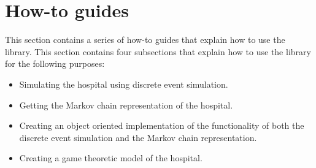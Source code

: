 \section{How-to guides}\label{sec:ambulance_game_how_to}

This section contains a series of how-to guides that explain how to use the
library.
This section contains four subsections that explain how to use the library
for the following purposes:

\begin{itemize}
    \item Simulating the hospital using discrete event simulation.
    \item Getting the Markov chain representation of the hospital.
    \item Creating an object oriented implementation of the functionality of
    both the discrete event simulation and the Markov chain representation.
    \item Creating a game theoretic model of the hospital. 
\end{itemize}









